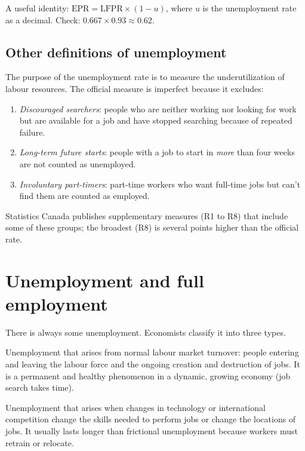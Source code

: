 \begin{remark}
A useful identity: $\text{EPR} = \text{LFPR} \times (1 - u)$, where $u$ is the
unemployment rate as a decimal. Check: $0.667 \times 0.93 \approx 0.62$.
\end{remark}

\subsection{Other definitions of unemployment}

The purpose of the unemployment rate is to measure the underutilization of labour
resources. The official measure is imperfect because it excludes:
\begin{enumerate}
  \item \emph{Discouraged searchers}: people who are neither working nor looking for work
        but are available for a job and have stopped searching because of repeated
        failure.
  \item \emph{Long-term future starts}: people with a job to start in \emph{more} than four
        weeks are not counted as unemployed.
  \item \emph{Involuntary part-timers}: part-time workers who want full-time jobs but
        can't find them are counted as employed.
\end{enumerate}
Statistics Canada publishes supplementary measures (R1 to R8) that include some of these
groups; the broadest (R8) is several points higher than the official rate.

\section{Unemployment and full employment}

There is always some unemployment. Economists classify it into three types.

\begin{definition}
Unemployment that arises from normal labour market turnover: people entering and
leaving the labour force and the ongoing creation and destruction of jobs. It is a
permanent and healthy phenomenon in a dynamic, growing economy (job search takes time).
\end{definition}

\begin{definition}
Unemployment that arises when changes in technology or international competition change
the skills needed to perform jobs or change the locations of jobs. It usually lasts
longer than frictional unemployment because workers must retrain or relocate.
\end{definition}

